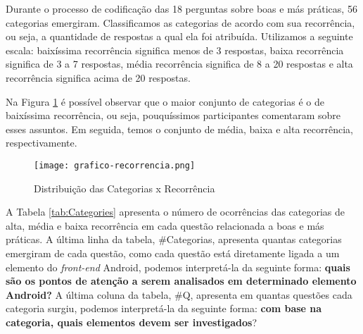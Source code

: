 Durante o processo de codifica\c{c}\~ao das 18 perguntas sobre boas e m\'as pr\'aticas, 56 categorias emergiram. Classificamos as categorias de acordo com sua recorr\^encia, ou seja, a quantidade de respostas a qual ela foi atribu\'ida. Utilizamos a seguinte escala: baix\'issima recorr\^encia significa menos de 3 respostas, baixa recorr\^encia significa de 3 a 7 respostas, m\'edia recorr\^encia significa de 8 a 20 respostas e alta recorr\^encia significa acima de 20 respostas.

Na Figura \ref{fig:CategoriaXRecorrencia} \'e poss\'ivel observar que o maior conjunto de categorias \'e o de baix\'issima recorr\^encia, ou seja, pouqu\'issimos participantes comentaram sobre esses assuntos. Em seguida, temos o conjunto de m\'edia, baixa e alta recorr\^encia, respectivamente.

\begin{figure}[!htb]
	\centering
	\texttt{[image: grafico-recorrencia.png]}
	\caption{Distribui\c{c}\~ao das Categorias x Recorr\^encia}
	\label{fig:CategoriaXRecorrencia}
\end{figure}


A Tabela \ref{tab:Categories} apresenta o n\'umero de ocorr\^encias das categorias de alta, m\'edia e baixa recorr\^encia em cada quest\~ao relacionada a boas e m\'as pr\'aticas. A \'ultima linha da tabela, \#Categorias, apresenta quantas categorias emergiram de cada quest\~ao, como cada quest\~ao est\'a diretamente ligada a um elemento do \textit{front-end} Android, podemos interpret\'a-la da seguinte forma: \textbf{quais s\~ao os pontos de aten\c{c}\~ao a serem analisados em determinado elemento Android?} A \'ultima coluna da tabela, \#Q, apresenta em quantas quest\~oes cada categoria surgiu, podemos interpret\'a-la da seguinte forma: \textbf{com base na categoria, quais elementos devem ser investigados}?




